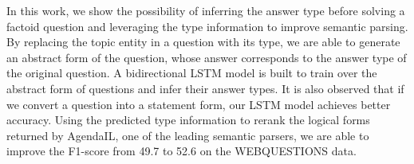 In this work, we show the possibility of inferring the answer type before solving a factoid question and leveraging the type information to improve semantic parsing.  By replacing the topic entity in a question with its type, we are able to generate an abstract form of the question, whose answer corresponds to the answer type of the original question. A bidirectional LSTM model is built to train over the abstract form of questions and infer their answer types.  It is also observed that if we convert a question into a statement form, our LSTM model achieves better accuracy.  Using the predicted type information to rerank the logical forms returned by AgendaIL, one of the leading semantic parsers, we are able to improve the F1-score from 49.7 to 52.6 on the WEBQUESTIONS data.
